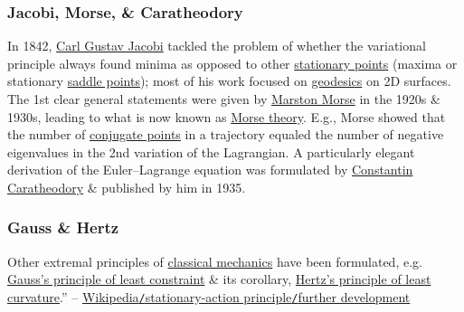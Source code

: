 \documentclass[oneside]{book}
\numberwithin{equation}{section}
\begin{document}
\subsubsection{Jacobi, Morse, \& Caratheodory}
In 1842, \href{https://en.wikipedia.org/wiki/Carl_Gustav_Jacobi}{Carl Gustav Jacobi} tackled the problem of whether the variational principle always found minima as opposed to other \href{https://en.wikipedia.org/wiki/Stationary_points}{stationary points} (maxima or stationary \href{https://en.wikipedia.org/wiki/Saddle_points}{saddle points}); most of his work focused on \href{https://en.wikipedia.org/wiki/Geodesics}{geodesics} on 2D surfaces. The 1st clear general statements were given by \href{https://en.wikipedia.org/wiki/Marston_Morse}{Marston Morse} in the 1920s \& 1930s, leading to what is now known as \href{https://en.wikipedia.org/wiki/Morse_theory}{Morse theory}. E.g., Morse showed that the number of \href{https://en.wikipedia.org/wiki/Conjugate_points}{conjugate points} in a trajectory equaled the number of negative eigenvalues in the 2nd variation of the Lagrangian. A particularly elegant derivation of the Euler--Lagrange equation was formulated by \href{https://en.wikipedia.org/wiki/Constantin_Caratheodory}{Constantin Caratheodory} \& published by him in 1935.

\subsubsection{Gauss \& Hertz}
Other extremal principles of \href{https://en.wikipedia.org/wiki/Classical_mechanics}{classical mechanics} have been formulated, e.g. \href{https://en.wikipedia.org/wiki/Gauss%27s_principle_of_least_constraint}{Gauss's principle of least constraint} \& its corollary, \href{https://en.wikipedia.org/wiki/Hertz%27s_principle_of_least_curvature}{Hertz's principle of least curvature}.'' -- \href{https://en.wikipedia.org/wiki/Stationary-action_principle#Further_development}{Wikipedia\texttt{/}stationary-action principle\texttt{/}further development}
\end{document}
